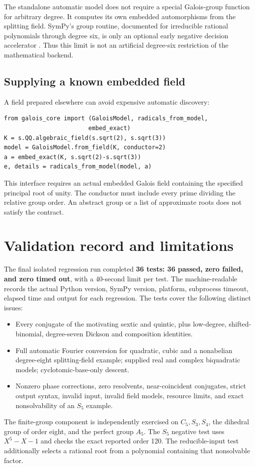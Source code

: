\documentclass[11pt,letterpaper]{article}
\theoremstyle{definition}\newtheorem{definition}[theorem]{Definition}
\theoremstyle{remark}\newtheorem{remark}[theorem]{Remark}
\begin{document}
The standalone automatic model does not require a special Galois-group
function for arbitrary degree. It computes its own embedded automorphisms
from the splitting field. SymPy's group routine, documented for irreducible
rational polynomials through degree six, is only an optional early negative
decision accelerator \cite{sympynumberfields}. Thus this limit is not an
artificial degree-six restriction of the mathematical backend.

\subsection{Supplying a known embedded field}

A field prepared elsewhere can avoid expensive automatic discovery:
\begin{lstlisting}
from galois_core import (GaloisModel, radicals_from_model,
                        embed_exact)
K = s.QQ.algebraic_field(s.sqrt(2), s.sqrt(3))
model = GaloisModel.from_field(K, conductor=2)
a = embed_exact(K, s.sqrt(2)-s.sqrt(3))
e, details = radicals_from_model(model, a)
\end{lstlisting}
This interface requires an actual embedded Galois field containing the
specified principal root of unity. The conductor must include every prime
dividing the relative group order. An abstract group or a list of approximate
roots does not satisfy the contract.

\section{Validation record and limitations}
\label{sec:validation}

The final isolated regression run completed \textbf{36 tests: 36 passed, zero failed, and zero timed out}, with a 40-second limit per test.
The machine-readable  records the actual
Python version, SymPy version, platform, subprocess timeout, elapsed time and
output for each regression. The tests cover the following distinct issues:
\begin{itemize}
\item Every conjugate of the motivating sextic and quintic, plus low-degree,
shifted-binomial, degree-seven Dickson and composition identities.
\item Full automatic Fourier conversion for quadratic, cubic and a
nonabelian degree-eight splitting-field example; supplied real and complex
biquadratic models; cyclotomic-base-only descent.
\item Nonzero phase corrections, zero resolvents, near-coincident conjugates,
strict output syntax, invalid input, invalid field models, resource limits,
and exact nonsolvability of an \(S_5\) example.
\end{itemize}
The finite-group component is independently exercised on \(C_5,S_3,S_4\),
the dihedral group of order eight, and the perfect group \(A_5\).
The \(S_5\) negative test uses \(X^5-X-1\) and checks the exact reported
order 120. The reducible-input test additionally selects a rational root
from a polynomial containing that nonsolvable factor.
\end{document}

